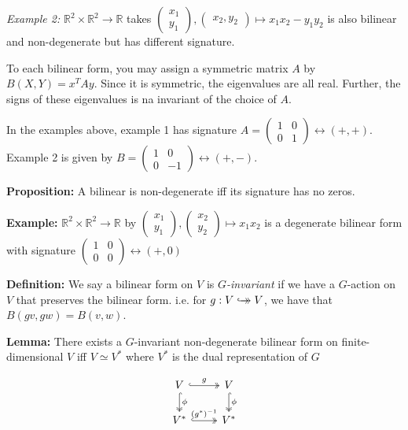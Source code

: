 \documentclass[12pt]{article}
\newcommand{\R}{\mathbb{R}}
\newcommand{\biject}{\hookrightarrow \hspace{-8pt} \rightarrow}
\begin{document}
    \emph{Example 2:}  $\R^2 \times \R^2 \to \R$ takes $\begin{pmatrix}
        x_1\\ y_1
    \end{pmatrix}, \begin{pmatrix}
        x_2, y_2
    \end{pmatrix} \mapsto x_1x_2 - y_1y_2$ is also bilinear and non-degenerate but has different signature. 

    To each bilinear form, you may assign a symmetric matrix $A$ by $B(X, Y) = x^T Ay$. Since it is symmetric, the eigenvalues are all real. Further, the signs of these eigenvalues is na invariant of the choice of $A$. 

    In the examples above, example 1 has signature $A = \begin{pmatrix}
        1 & 0\\ 
        0 & 1
    \end{pmatrix} \leftrightarrow (+, +)$. Example 2 is given by $B =\begin{pmatrix}
        1 & 0\\ 
        0 & -1
    \end{pmatrix} \leftrightarrow (+, -)$. 

    \textbf{Proposition:} A bilinear is non-degenerate iff its signature has no zeros. 

    \textbf{Example:} $\R^2 \times \R^2 \to \R$ by $\begin{pmatrix}
        x_1\\ y_1
    \end{pmatrix}, \begin{pmatrix}
        x_2\\y_2
    \end{pmatrix} \mapsto x_1x_2 $ is a degenerate bilinear form with signature $\begin{pmatrix}
        1 & 0\\ 
        0 & 0
    \end{pmatrix} \leftrightarrow (+, 0)$ 

    \textbf{Definition:} We say a bilinear form on $V$ is \emph{$G$-invariant} if we have a $G$-action on $V$ that preserves the bilinear form. i.e. for $g: V \biject V$, we have that $B(gv, gw) = B(v, w)$. 

    \textbf{Lemma:} There exists a $G$-invariant non-degenerate bilinear form on finite-dimensional $V$ iff $V \simeq V^*$ where $V^*$ is the dual representation of $G$

    \[\begin{tikzcd}
        V \arrow[two heads, hook]{r}{g} \arrow[two heads, hook]{d}{\phi} & V  \arrow[two heads, hook]{d}{\phi}\\ 
        V^*  \arrow[two heads, hook]{r}{(g^*)^{-1}} & V^*
    \end{tikzcd}\] 
\end{document}
